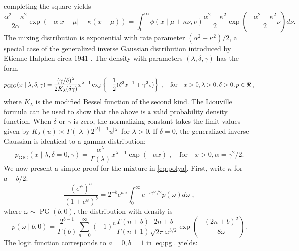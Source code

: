 \documentclass[lineno]{biometrika}
\begin{document}
completing the square yields
\begin{equation*}
  \frac{\alpha^2-\kappa^2}{2\alpha} \exp\left(-\alpha|x-\mu| + \kappa(x-\mu)\right) 
  = \int_0^{\infty} \phi(x \mid \mu + \kappa \nu, \nu) 
  \frac{\alpha^2-\kappa^2}{2} \exp\left(-\frac{\alpha^2-\kappa^2}{2} \nu \right) d \nu. 
\end{equation*}
The mixing distribution is exponential with rate parameter
$(\alpha^2-\kappa^2)/2$, a special case of the generalized inverse Gaussian
distribution introduced by Etienne Halphen circa 1941
\citep{seshadri1997halphen}.  The density with parameters $(\lambda, \delta, \gamma)$ 
has the form 
\begin{equation*}
  p_{\mathrm{GIG}}(x \mid \lambda, \delta, \gamma) = 
  \frac{(\gamma/\delta)^{\lambda}}{2 K_{\lambda}(\delta \gamma)} x^{\lambda-1} 
  \exp\left\{ -\half (\delta^2 x^{-1} + \gamma^2 x )\right\}
  \;, 
  \quad\text{for}\quad x > 0, \lambda >0, \delta > 0,  p \in \Re
  \;,
\end{equation*}
where $K_{\lambda}$ is the modified Bessel function of the second kind.  The
Liouville formula can be used to show that the above is a valid probability density
function.  When $\delta$ or $\gamma$ is zero, the normalizing constant takes 
the limit values given by
$K_{\lambda}(u) \asymp \Gamma(|\lambda|) 2^{|\lambda|-1} u^{|\lambda|}$ 
for $\lambda > 0$.  If $\delta=0$, the generalized
inverse Gaussian is identical to a gamma distribution:
$$
p_{\mathrm{GIG}}(x \mid \lambda, \delta = 0 , \gamma) 
= \frac{\alpha^{\lambda}}{\Gamma(\lambda)} x^{\lambda-1} \exp(-\alpha x) 
\;, \quad\text{for}\quad x > 0, \alpha = \gamma^2 / 2.
$$
%
We now present a simple proof for the \PG{} mixture in \eqref{eq:polya}. 
First, write $\kappa$ for $a-b/2$: 
\begin{equation}
  \frac{(e^{\psi})^a}{(1+e^{\psi})^b} = 2^{-b} e^{\kappa \omega} 
  \int_0^{\infty} e^{-\omega \psi^2/2} p(\omega) d\omega
  \;, 
  \label{eq:pg}
\end{equation}
where $\omega \sim \operatorname{PG}(b,0)$, the \PG{} distribution with density is
$$
p(\omega \mid b, 0) = \frac{2^{b-1}}{\Gamma(b)} 
\sum_{n=0}^{\infty} (-1)^n \frac{\Gamma(n+b)}{\Gamma(n+1)} 
\frac{2n + b}{\sqrt{2 \pi} \omega^{3/2}} 
\exp\left(-\frac{(2 n + b)^2}{8 \omega} \right).
$$
The logit function corresponds to $a=0,b=1$ in \eqref{eq:pg}. \CS{} yields:  
\end{document}
